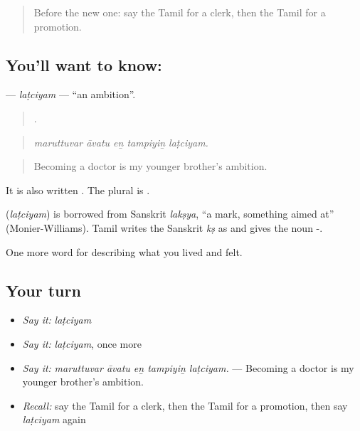 \begin{quote}
Before the new one: say the Tamil for a clerk, then the Tamil for a promotion.
\end{quote}

\subsection*{You'll want to know: }
\textbf{} — \emph{laṭciyam} — \textquotedblleft{}an ambition\textquotedblright{}.

\begin{quote}
    .
\end{quote}

\begin{quote}
\emph{maruttuvar āvatu eṉ tampiyiṉ laṭciyam.}
\end{quote}

\begin{quote}
Becoming a doctor is my younger brother's ambition.
\end{quote}

It is also written . The plural is .

\begin{cousinweb}
\textbf{} (\emph{laṭciyam}) is borrowed from Sanskrit \emph{lakṣya}, \textquotedblleft{}a mark, something aimed at\textquotedblright{} (Monier-Williams). Tamil writes the Sanskrit \emph{kṣ} as  and gives the noun -.
\end{cousinweb}

\begin{grammarlens}[title={What you've built}]
One more word for describing what you lived and felt.
\end{grammarlens}

\subsection*{Your turn}
\begin{itemize}
\raggedright
  \item \emph{Say it:} \emph{laṭciyam}
  \item \emph{Say it:} \emph{laṭciyam}, once more
  \item \emph{Say it:} \emph{maruttuvar āvatu eṉ tampiyiṉ laṭciyam.} — Becoming a doctor is my younger brother's ambition.
  \item \emph{Recall:} say the Tamil for a clerk, then the Tamil for a promotion, then say \emph{laṭciyam} again
\end{itemize}

